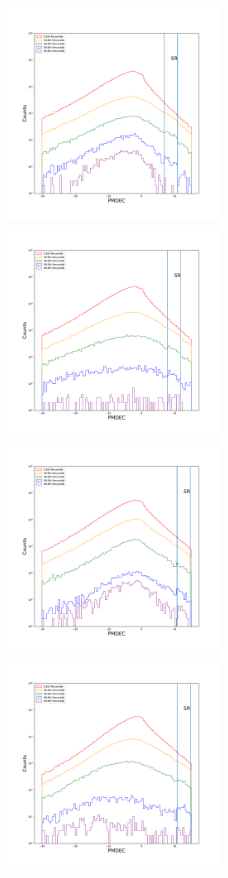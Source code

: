 \documentclass[12pt,prd]{article}
\begin{document}
\begin{figure}[h!]
\includegraphics[width=0.5\textwidth]{../figures/scanning_plotsgaiascan_l67_5_b74_4_ra208_6_dec35_1_npy.pdf}
\includegraphics[width=0.5\textwidth]{../figures/scanning_plotsgaiascan_l75_0_b66_4_ra216_0_dec41_0_npy.pdf}
\includegraphics[width=0.5\textwidth]{../figures/scanning_plotsgaiascan_l78_8_b58_4_ra224_7_dec46_3_npy.pdf}
\includegraphics[width=0.5\textwidth]{../figures/scanning_plotsgaiascan_l99_0_b50_2_ra224_7_dec60_6_npy.pdf}
\end{figure}
\end{document}
